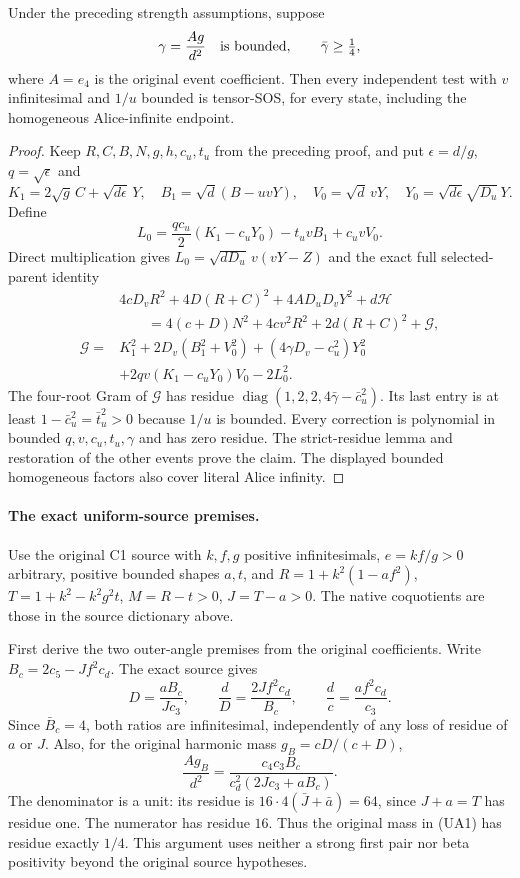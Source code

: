 \begin{lemma}
Under the preceding strength assumptions, suppose
\[
 \gamma=\frac{A g}{d^2}\quad\hbox{is bounded},\qquad \bar\gamma\geq\tfrac14,
\]
where $A=e_4$ is the original event coefficient. Then every independent
test with $v$ infinitesimal and $1/u$ bounded is tensor-SOS, for every
state, including the homogeneous Alice-infinite endpoint.
\end{lemma}
\begin{proof}
Keep $R,C,B,N,g,h,c_u,t_u$ from the preceding proof, and put
$\epsilon=d/g$, $q=\sqrt\epsilon$ and
\[
 K_1=2\sqrt g\,C+\sqrt{d\epsilon}\,Y,\quad
 B_1=\sqrt d(B-uvY),\quad V_0=\sqrt d\,vY,
 \quad Y_0=\sqrt{d\epsilon}\sqrt{D_u}\,Y.
\]
Define
\[
 L_0=\frac{qc_u}{2}(K_1-c_uY_0)-t_uvB_1+c_uvV_0.
\]
Direct multiplication gives $L_0=\sqrt{dD_u}\,v(vY-Z)$ and the exact
full selected-parent identity
\[
\begin{split}
&4cD_vR^2+4D(R+C)^2+4AD_uD_vY^2+d\mathcal H\\
&\qquad=4(c+D)N^2+4cv^2R^2+2d(R+C)^2+\mathcal G,\\
\mathcal G={}&K_1^2+2D_v(B_1^2+V_0^2)
 +(4\gamma D_v-c_u^2)Y_0^2\\
&+2qv(K_1-c_uY_0)V_0-2L_0^2.
\end{split}
\]
The four-root Gram of $\mathcal G$ has residue
$\operatorname{diag}(1,2,2,4\bar\gamma-\bar c_u^2)$.
Its last entry is at least $1-\bar c_u^2=\bar t_u^2>0$ because $1/u$
is bounded. Every correction is polynomial in bounded
$q,v,c_u,t_u,\gamma$ and has zero residue. The strict-residue lemma and
restoration of the other events prove the claim. The displayed bounded
homogeneous factors also cover literal Alice infinity.
\end{proof}

\paragraph{The exact uniform-source premises.}
Use the original C1 source with $k,f,g$ positive infinitesimals,
$e=kf/g>0$ arbitrary, positive bounded shapes $a,t$, and
$R=1+k^2(1-af^2)$, $T=1+k^2-k^2g^2t$, $M=R-t>0$, $J=T-a>0$.
The native coquotients are those in the source dictionary above.

First derive the two outer-angle premises from the original coefficients.
Write $B_c=2c_5-Jf^2c_d$. The exact source gives
\[
 D=\frac{aB_c}{Jc_3},\qquad
 \frac dD=\frac{2Jf^2c_d}{B_c},\qquad
 \frac dc=\frac{af^2c_d}{c_3}.
\]
Since $\bar B_c=4$, both ratios are infinitesimal, independently of
any loss of residue of $a$ or $J$. Also, for the original harmonic
mass $g_B=cD/(c+D)$,
\[
 \frac{A g_B}{d^2}
 =\frac{c_4c_3B_c}{c_d^2(2Jc_3+aB_c)}.              \tag{UA1}
\]
The denominator is a unit: its residue is
$16\cdot4(\bar J+\bar a)=64$, since $J+a=T$ has residue one.
The numerator has residue $16$. Thus the original mass in (UA1) has
residue exactly $1/4$. This argument uses neither a strong first pair
nor beta positivity beyond the original source hypotheses.

